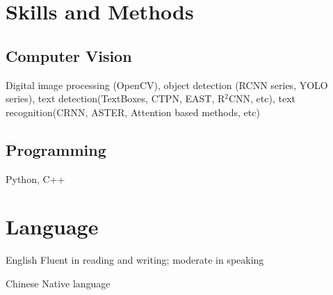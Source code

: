 \documentclass[12pt,letterpaper]{report}
\newcommand{\listitemspace}{0.15em}%
\newenvironment{desp}
{\begin{list}{}{\setlength{\leftmargin}{0em}
			\setlength{\parskip}{0em}
			\setlength{\itemsep}{\listitemspace}
			\setlength{\parsep}{\listitemspace}}}
	{\end{list}}
\begin{document}
	\section*{Skills and Methods}

	 \subsection*{Computer Vision}
	   \begin{desp}
	     \item Digital image processing (OpenCV), object detection (RCNN series, YOLO series), text detection(TextBoxes, CTPN, EAST, R$^2$CNN, etc), text recognition(CRNN, ASTER, Attention based methods, etc)
	   \end{desp}
	 \subsection*{Programming}
	   \begin{desp}
       \item Python, C++
	   \end{desp}

  \section*{Language}

  \begin{tablist}
    \item[English] \tab Fluent in reading and writing; moderate in speaking
		\item[Chinese] \tab Native language
	\end{tablist}

	\begin{center}
		\vspace{6em}
	\end{center}
\end{document}
